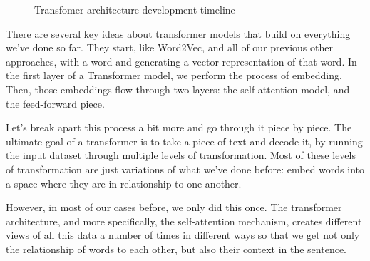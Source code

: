 \documentclass[draft, 11pt]{diazessay} %
\begin{document}
\begin{figure}[!ht]
        \caption{Transfomer architecture development timeline\citep{amatriain2023transformer}}
      \end{figure}

There are several key ideas about transformer models that build on everything we've done so far. They start, like Word2Vec, and all of our previous other approaches, with a word and generating a vector representation of that word. In the first layer of a Transformer model, we perform the process of embedding. Then, those embeddings flow through two layers: the self-attention model, and the feed-forward piece. 

Let's break apart this process a bit more and go through it piece by piece. The ultimate goal of a transformer is to take a piece of text and decode it, by running the input dataset through multiple levels of transformation. Most of these levels of transformation are just variations of what we've done before: embed words into a space where they are in relationship to one another. 

However, in most of our cases before, we only did this once. The transformer architecture, and more specifically, the self-attention mechanism, creates different views of all this data a number of times in different ways so that we get not only the relationship of words to each other, but also their context in the sentence. 
\end{document}
